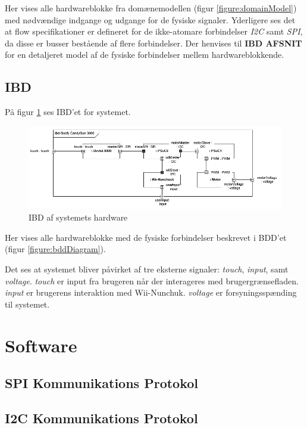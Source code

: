Her vises alle hardwareblokke fra domænemodellen (figur \ref{figure:domainModel}) med nødvændige indgange og udgange for de fysiske signaler. Yderligere ses det at flow specifikationer er defineret for de ikke-atomare forbindelser \textit{I2C} samt \textit{SPI}, da disse er busser bestående af flere forbindelser. Der henvises til \textbf{IBD AFSNIT} for en detaljeret model af de fysiske forbindelser mellem hardwareblokkende.

\subsection{IBD}

På figur \ref{figure:ibdDiagram} ses IBD'et for systemet.

\begin{figure}[H]
	\centering
	\includegraphics[width=\textwidth]{SystemArkitektur/images/GoofyCandyIBDImageRev2.PNG}
	\caption{IBD af systemets hardware}
	\label{figure:ibdDiagram}
\end{figure}

Her vises alle hardwareblokke med de fysiske forbindelser beskrevet i BDD'et (figur \ref{figure:bddDiagram}). 

Det ses at systemet bliver påvirket af tre eksterne signaler: \textit{touch}, \textit{input}, samt \textit{voltage}. \textit{touch} er input fra brugeren når der interageres med brugergrænsefladen. \textit{input} er brugerens interaktion med Wii-Nunchuk. \textit{voltage} er forsyningsspænding til systemet.

\section{Software}

\subsection{SPI Kommunikations Protokol}

\subsection{I2C Kommunikations Protokol}



